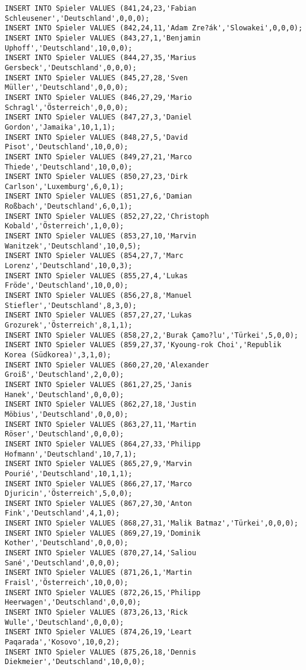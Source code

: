 \documentclass{bschlangaul-aufgabe}
\begin{document}
\begin{verbatim}
INSERT INTO Spieler VALUES (841,24,23,'Fabian Schleusener','Deutschland',0,0,0);
INSERT INTO Spieler VALUES (842,24,11,'Adam Zre?ák','Slowakei',0,0,0);
INSERT INTO Spieler VALUES (843,27,1,'Benjamin Uphoff','Deutschland',10,0,0);
INSERT INTO Spieler VALUES (844,27,35,'Marius Gersbeck','Deutschland',0,0,0);
INSERT INTO Spieler VALUES (845,27,28,'Sven Müller','Deutschland',0,0,0);
INSERT INTO Spieler VALUES (846,27,29,'Mario Schragl','Österreich',0,0,0);
INSERT INTO Spieler VALUES (847,27,3,'Daniel Gordon','Jamaika',10,1,1);
INSERT INTO Spieler VALUES (848,27,5,'David Pisot','Deutschland',10,0,0);
INSERT INTO Spieler VALUES (849,27,21,'Marco Thiede','Deutschland',10,0,0);
INSERT INTO Spieler VALUES (850,27,23,'Dirk Carlson','Luxemburg',6,0,1);
INSERT INTO Spieler VALUES (851,27,6,'Damian Roßbach','Deutschland',6,0,1);
INSERT INTO Spieler VALUES (852,27,22,'Christoph Kobald','Österreich',1,0,0);
INSERT INTO Spieler VALUES (853,27,10,'Marvin Wanitzek','Deutschland',10,0,5);
INSERT INTO Spieler VALUES (854,27,7,'Marc Lorenz','Deutschland',10,0,3);
INSERT INTO Spieler VALUES (855,27,4,'Lukas Fröde','Deutschland',10,0,0);
INSERT INTO Spieler VALUES (856,27,8,'Manuel Stiefler','Deutschland',8,3,0);
INSERT INTO Spieler VALUES (857,27,27,'Lukas Grozurek','Österreich',8,1,1);
INSERT INTO Spieler VALUES (858,27,2,'Burak Çamo?lu','Türkei',5,0,0);
INSERT INTO Spieler VALUES (859,27,37,'Kyoung-rok Choi','Republik Korea (Südkorea)',3,1,0);
INSERT INTO Spieler VALUES (860,27,20,'Alexander Groiß','Deutschland',2,0,0);
INSERT INTO Spieler VALUES (861,27,25,'Janis Hanek','Deutschland',0,0,0);
INSERT INTO Spieler VALUES (862,27,18,'Justin Möbius','Deutschland',0,0,0);
INSERT INTO Spieler VALUES (863,27,11,'Martin Röser','Deutschland',0,0,0);
INSERT INTO Spieler VALUES (864,27,33,'Philipp Hofmann','Deutschland',10,7,1);
INSERT INTO Spieler VALUES (865,27,9,'Marvin Pourié','Deutschland',10,1,1);
INSERT INTO Spieler VALUES (866,27,17,'Marco Djuricin','Österreich',5,0,0);
INSERT INTO Spieler VALUES (867,27,30,'Anton Fink','Deutschland',4,1,0);
INSERT INTO Spieler VALUES (868,27,31,'Malik Batmaz','Türkei',0,0,0);
INSERT INTO Spieler VALUES (869,27,19,'Dominik Kother','Deutschland',0,0,0);
INSERT INTO Spieler VALUES (870,27,14,'Saliou Sané','Deutschland',0,0,0);
INSERT INTO Spieler VALUES (871,26,1,'Martin Fraisl','Österreich',10,0,0);
INSERT INTO Spieler VALUES (872,26,15,'Philipp Heerwagen','Deutschland',0,0,0);
INSERT INTO Spieler VALUES (873,26,13,'Rick Wulle','Deutschland',0,0,0);
INSERT INTO Spieler VALUES (874,26,19,'Leart Paqarada','Kosovo',10,0,2);
INSERT INTO Spieler VALUES (875,26,18,'Dennis Diekmeier','Deutschland',10,0,0);

\end{verbatim}
\end{document}
